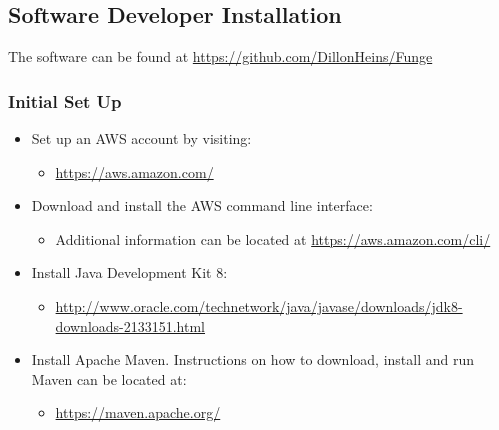 \documentclass{article}
\begin{document}
	\subsection{Software Developer Installation}
		The software can be found at \url{https://github.com/DillonHeins/Funge}
		\subsubsection{Initial Set Up}
			\begin{itemize}
				\item Set up an AWS account by visiting:
					\begin{itemize}
						\item \url{https://aws.amazon.com/}
					\end{itemize}
				\item Download and install the AWS command line interface:
					\begin{itemize}
						\item Additional information can be located at \url{https://aws.amazon.com/cli/}
					\end{itemize}
				\item Install Java Development Kit 8:
					\begin{itemize}
						\item \url{http://www.oracle.com/technetwork/java/javase/downloads/jdk8-downloads-2133151.html}
					\end{itemize}
				\item Install Apache Maven. Instructions on how to download, install and run Maven can be located at:
					\begin{itemize}
						\item \url{https://maven.apache.org/}
					\end{itemize}
			\end{itemize}
\end{document}
